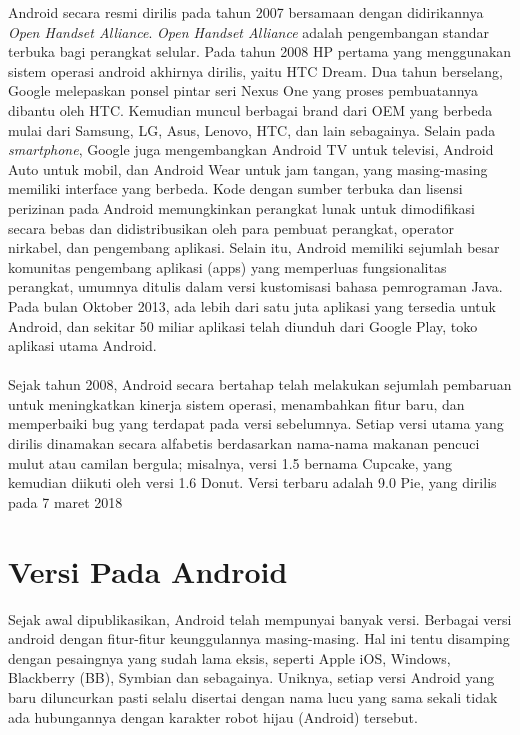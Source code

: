 Android secara resmi dirilis pada tahun 2007 bersamaan dengan didirikannya \textit{Open Handset Alliance}. \textit{Open Handset Alliance} adalah pengembangan standar terbuka bagi perangkat selular. Pada tahun 2008 HP pertama yang menggunakan sistem operasi android akhirnya dirilis, yaitu HTC Dream. Dua tahun berselang, Google melepaskan ponsel pintar seri Nexus One yang proses pembuatannya dibantu oleh HTC. Kemudian muncul berbagai brand dari OEM yang berbeda mulai dari Samsung, LG, Asus, Lenovo, HTC, dan lain sebagainya. Selain pada \textit{smartphone}, Google juga mengembangkan Android TV untuk televisi, Android Auto untuk mobil, dan Android Wear untuk jam tangan, yang masing-masing memiliki interface yang berbeda. Kode dengan sumber terbuka dan lisensi perizinan pada Android memungkinkan perangkat lunak untuk dimodifikasi secara bebas dan didistribusikan oleh para pembuat perangkat, operator nirkabel, dan pengembang aplikasi. Selain itu, Android memiliki sejumlah besar komunitas pengembang aplikasi (apps) yang memperluas fungsionalitas perangkat, umumnya ditulis dalam versi kustomisasi bahasa pemrograman Java. Pada bulan Oktober 2013, ada lebih dari satu juta aplikasi yang tersedia untuk Android, dan sekitar 50 miliar aplikasi telah diunduh dari Google Play, toko aplikasi utama Android.\\
\\
Sejak tahun 2008, Android secara bertahap telah melakukan sejumlah pembaruan untuk meningkatkan kinerja sistem operasi, menambahkan fitur baru, dan memperbaiki bug yang terdapat pada versi sebelumnya. Setiap versi utama yang dirilis dinamakan secara alfabetis berdasarkan nama-nama makanan pencuci mulut atau camilan bergula; misalnya, versi 1.5 bernama Cupcake, yang kemudian diikuti oleh versi 1.6 Donut. Versi terbaru adalah 9.0 Pie, yang dirilis pada 7 maret 2018

\section{Versi Pada Android}
Sejak awal dipublikasikan, Android telah mempunyai banyak versi. Berbagai versi android dengan fitur-fitur keunggulannya masing-masing. Hal ini tentu disamping dengan pesaingnya yang sudah lama eksis, seperti Apple iOS, Windows, Blackberry (BB), Symbian dan sebagainya. Uniknya, setiap versi Android yang baru diluncurkan pasti selalu disertai dengan nama lucu yang sama sekali tidak ada hubungannya dengan karakter robot hijau (Android) tersebut.

